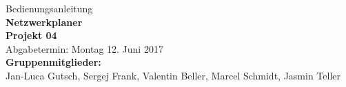 \documentclass[parskip=half]{scrartcl}
\newcommand{\autoren}{Jan-Luca Gutsch, Sergej Frank, Valentin Beller, Marcel Schmidt, Jasmin Teller}
\newcommand{\titel}{Bedienungsanleitung}
\newcommand{\untertitel}{Netzwerkplaner}
\newcommand{\Projekt}{Projekt 04}
\begin{document}


\begin{titlepage}
\begin{center}
\Large{\titel}\\[12ex]
\Large{\textbf{\untertitel}}\\[2ex]
\huge{\textbf{\Projekt}}\\[1.5ex]
\normalsize
Abgabetermin: Montag 12. Juni 2017\\[3em]
\textbf{Gruppenmitglieder:}\\
\autoren \\[5ex]
\end{center}
\end{titlepage}
\tableofcontents
\clearpage










\end{document}
